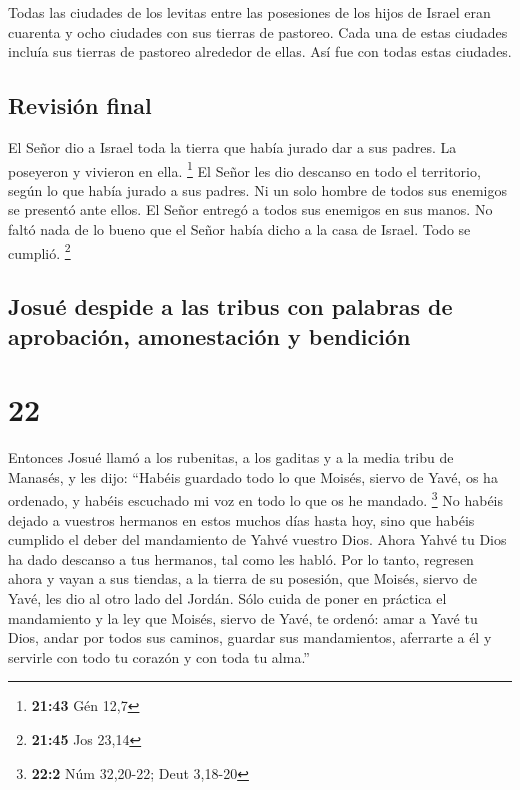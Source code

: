  Todas las ciudades de los levitas entre las posesiones
de los hijos de Israel eran cuarenta y ocho ciudades con sus tierras de
pastoreo.  Cada una de estas ciudades incluía sus tierras
de pastoreo alrededor de ellas. Así fue con todas estas ciudades.

\hypertarget{revisiuxf3n-final}{%
\subsection{Revisión final}\label{revisiuxf3n-final}}

 El Señor dio a Israel toda la tierra que había jurado
dar a sus padres. La poseyeron y vivieron en ella. \footnote{\textbf{21:43}
  Gén 12,7}  El Señor les dio descanso en todo el
territorio, según lo que había jurado a sus padres. Ni un solo hombre de
todos sus enemigos se presentó ante ellos. El Señor entregó a todos sus
enemigos en sus manos.  No faltó nada de lo bueno que el
Señor había dicho a la casa de Israel. Todo se cumplió. \footnote{\textbf{21:45}
  Jos 23,14}

\hypertarget{josuuxe9-despide-a-las-tribus-con-palabras-de-aprobaciuxf3n-amonestaciuxf3n-y-bendiciuxf3n}{%
\subsection{Josué despide a las tribus con palabras de aprobación,
amonestación y
bendición}\label{josuuxe9-despide-a-las-tribus-con-palabras-de-aprobaciuxf3n-amonestaciuxf3n-y-bendiciuxf3n}}

\hypertarget{section-21}{%
\section{22}\label{section-21}}

 Entonces Josué llamó a los rubenitas, a los gaditas y a
la media tribu de Manasés,  y les dijo: ``Habéis guardado
todo lo que Moisés, siervo de Yavé, os ha ordenado, y habéis escuchado
mi voz en todo lo que os he mandado. \footnote{\textbf{22:2} Núm
  32,20-22; Deut 3,18-20}  No habéis dejado a vuestros
hermanos en estos muchos días hasta hoy, sino que habéis cumplido el
deber del mandamiento de Yahvé vuestro Dios.  Ahora Yahvé
tu Dios ha dado descanso a tus hermanos, tal como les habló. Por lo
tanto, regresen ahora y vayan a sus tiendas, a la tierra de su posesión,
que Moisés, siervo de Yavé, les dio al otro lado del Jordán.
 Sólo cuida de poner en práctica el mandamiento y la ley
que Moisés, siervo de Yavé, te ordenó: amar a Yavé tu Dios, andar por
todos sus caminos, guardar sus mandamientos, aferrarte a él y servirle
con todo tu corazón y con toda tu alma.''

